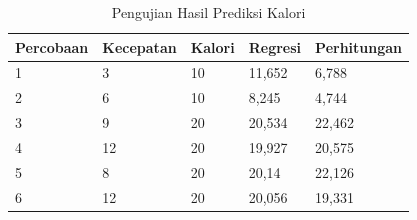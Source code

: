 \begin{table}
  \caption{Pengujian Hasil Prediksi Kalori}
  \label{tab:PengujianPrediksi}
  \centering
  \begin{tabular}{lllll}
    \toprule
    Percobaan & Kecepatan & Kalori  &  Regresi & Perhitungan \\
    \midrule
    1   & 3     & 10    & 11,652    & 6,788   \\
    2   & 6     & 10    & 8,245     & 4,744   \\
    3   & 9     & 20    & 20,534    & 22,462   \\
    4   & 12    & 20    & 19,927    & 20,575   \\
    5   & 8     & 20    & 20,14     & 22,126   \\
    6   & 12    & 20    & 20,056    & 19,331   \\
    \bottomrule
  \end{tabular}
\end{table}
